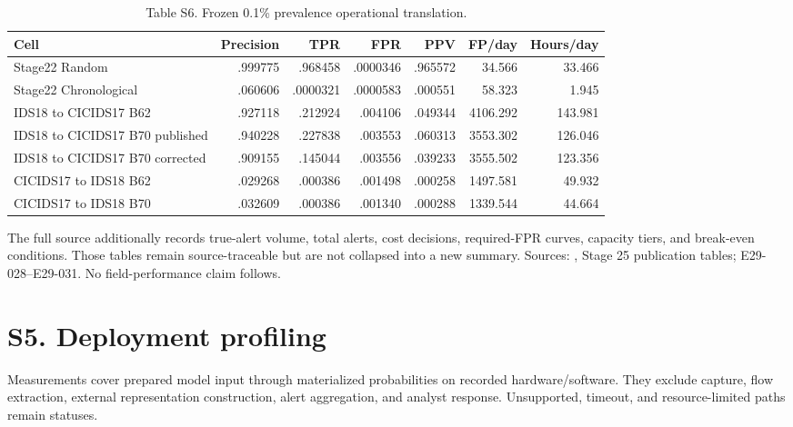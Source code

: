 \documentclass[preprint,12pt]{elsarticle}
\begin{document}
\begin{table}[htbp]
\centering\tiny
\caption{Table S6. Frozen 0.1\% prevalence operational translation.}
\begin{tabular}{@{}lrrrrrr@{}}
\toprule
Cell & Precision & TPR & FPR & PPV & FP/day & Hours/day\\
\midrule
Stage22 Random & .999775 & .968458 & .0000346 & .965572 & 34.566 & 33.466\\
Stage22 Chronological & .060606 & .0000321 & .0000583 & .000551 & 58.323 & 1.945\\
IDS18 to CICIDS17 B62 & .927118 & .212924 & .004106 & .049344 & 4106.292 & 143.981\\
IDS18 to CICIDS17 B70 published & .940228 & .227838 & .003553 & .060313 & 3553.302 & 126.046\\
IDS18 to CICIDS17 B70 corrected & .909155 & .145044 & .003556 & .039233 & 3555.502 & 123.356\\
CICIDS17 to IDS18 B62 & .029268 & .000386 & .001498 & .000258 & 1497.581 & 49.932\\
CICIDS17 to IDS18 B70 & .032609 & .000386 & .001340 & .000288 & 1339.544 & 44.664\\
\bottomrule
\end{tabular}
\end{table}
The full source additionally records true-alert volume, total alerts, cost decisions, required-FPR curves, capacity tiers, and break-even conditions. Those tables remain source-traceable but are not collapsed into a new summary. Sources: , Stage 25 publication tables; E29-028--E29-031. No field-performance claim follows.

\section*{S5. Deployment profiling}
Measurements cover prepared model input through materialized probabilities on recorded hardware/software. They exclude capture, flow extraction, external representation construction, alert aggregation, and analyst response. Unsupported, timeout, and resource-limited paths remain statuses.
\end{document}
